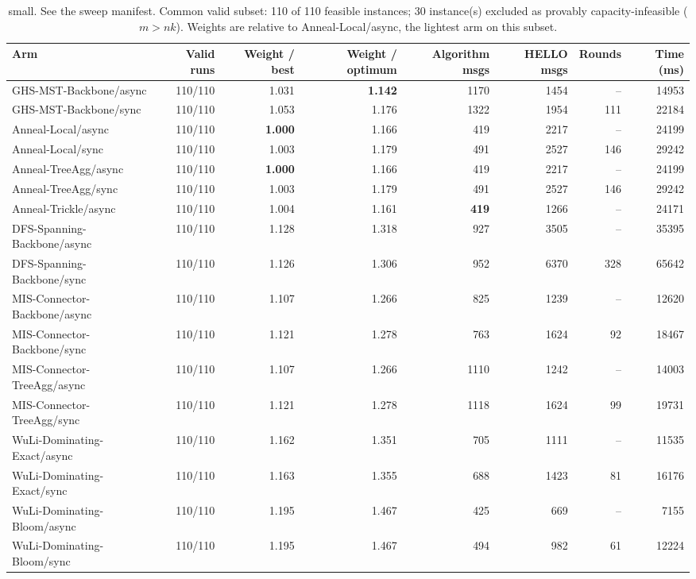 \begin{table}[tb]
\centering
\caption{small. See the sweep manifest. Common valid subset: 110 of 110 feasible instances; 30 instance(s) excluded as provably capacity-infeasible ($m > nk$). Weights are relative to Anneal-Local/async, the lightest arm on this subset.}
\label{tab:cmp-small}
\begin{tabular}{lrrrrrrr}
\toprule
Arm & Valid runs & Weight / best & Weight / optimum & Algorithm msgs & HELLO msgs & Rounds & Time (ms) \\
\midrule
GHS-MST-Backbone/async & 110/110 & 1.031 & \textbf{1.142} & 1170 & 1454 & -- & 14953 \\
GHS-MST-Backbone/sync & 110/110 & 1.053 & 1.176 & 1322 & 1954 & 111 & 22184 \\
Anneal-Local/async & 110/110 & \textbf{1.000} & 1.166 & 419 & 2217 & -- & 24199 \\
Anneal-Local/sync & 110/110 & 1.003 & 1.179 & 491 & 2527 & 146 & 29242 \\
Anneal-TreeAgg/async & 110/110 & \textbf{1.000} & 1.166 & 419 & 2217 & -- & 24199 \\
Anneal-TreeAgg/sync & 110/110 & 1.003 & 1.179 & 491 & 2527 & 146 & 29242 \\
Anneal-Trickle/async & 110/110 & 1.004 & 1.161 & \textbf{419} & 1266 & -- & 24171 \\
DFS-Spanning-Backbone/async & 110/110 & 1.128 & 1.318 & 927 & 3505 & -- & 35395 \\
DFS-Spanning-Backbone/sync & 110/110 & 1.126 & 1.306 & 952 & 6370 & 328 & 65642 \\
MIS-Connector-Backbone/async & 110/110 & 1.107 & 1.266 & 825 & 1239 & -- & 12620 \\
MIS-Connector-Backbone/sync & 110/110 & 1.121 & 1.278 & 763 & 1624 & 92 & 18467 \\
MIS-Connector-TreeAgg/async & 110/110 & 1.107 & 1.266 & 1110 & 1242 & -- & 14003 \\
MIS-Connector-TreeAgg/sync & 110/110 & 1.121 & 1.278 & 1118 & 1624 & 99 & 19731 \\
WuLi-Dominating-Exact/async & 110/110 & 1.162 & 1.351 & 705 & 1111 & -- & 11535 \\
WuLi-Dominating-Exact/sync & 110/110 & 1.163 & 1.355 & 688 & 1423 & 81 & 16176 \\
WuLi-Dominating-Bloom/async & 110/110 & 1.195 & 1.467 & 425 & 669 & -- & 7155 \\
WuLi-Dominating-Bloom/sync & 110/110 & 1.195 & 1.467 & 494 & 982 & 61 & 12224 \\

\end{tabular}
\end{table}
